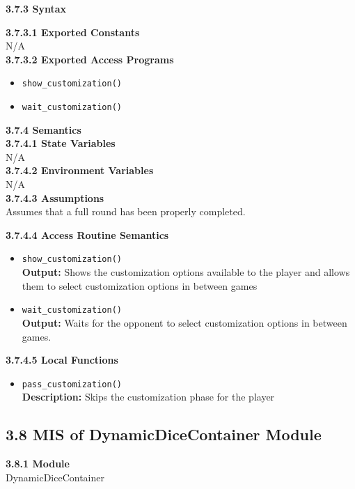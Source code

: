 \documentclass[12pt, titlepage]{article}
\begin{document}
\noindent \textbf{3.7.3 Syntax}

\noindent \textbf{3.7.3.1 Exported Constants}\\
N/A\\

\textbf{3.7.3.2 Exported Access Programs}
\begin{itemize}
	\item \texttt{show\_customization()}
	\item \texttt{wait\_customization()}
	
	
\end{itemize}

\noindent \textbf{3.7.4 Semantics}\\
\textbf{3.7.4.1 State Variables}\\

N/A\\

\textbf{3.7.4.2 Environment Variables}\\

N/A\\



\textbf{3.7.4.3 Assumptions}\\
Assumes that a full round has been properly completed.

\textbf{3.7.4.4 Access Routine Semantics}
\begin{itemize}

	\item \texttt{show\_customization()}\\
	\textbf{Output:} Shows the customization options available to the player and allows them to select customization options in between games
	
	\item \texttt{wait\_customization()}\\
	\textbf{Output:} Waits for the opponent to select customization options in between games.
	
	


\end{itemize}

\textbf{3.7.4.5 Local Functions}

\begin{itemize}
    \item \texttt{pass\_customization()}\\
    	\textbf{Description:} Skips the customization phase for the player
\end{itemize}


\subsection*{3.8 MIS of DynamicDiceContainer Module}
\textbf{3.8.1 Module}\\
 DynamicDiceContainer\\
\end{document}
